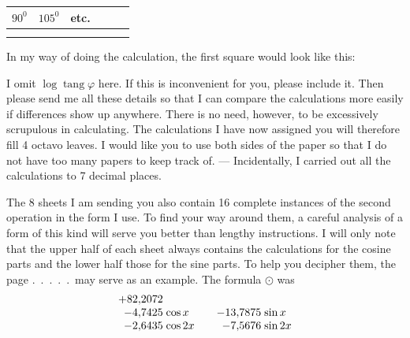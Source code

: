 \begin{landscape}
\begin{center}
\begin{tabular}{|c|c|c|c|c|c|}
\(90^0\)&\(105^0\)&etc.&&&\\\hline
\rule{0pt}{1.8em}&&&&&\\\hline
\rule{0pt}{1.8em}&&&&&\\\hline
\end{tabular}
\end{center}\endgroup
{}
\par\noindent In my way of doing the calculation, the first square would look like this:
\begin{center}
\end{center}
\par\noindent I omit \(\log\operatorname{tang}\varphi\) here. If this is inconvenient for you,
please include it.
Then please send me all these details so that
I can compare the calculations more easily if
differences show up anywhere. There is no need,
however, to be excessively scrupulous in calculating. The calculations I have now assigned you will therefore fill 4 octavo leaves. I would like you to use both sides of the paper so that I do not have too many
papers to keep track of. — Incidentally, I carried out all the calculations to 7 decimal places.
\par\noindent\hspace*{\parindent}The 8 sheets I am sending you also contain 16 complete instances of the second operation in the form I use. To find your
way around them, a careful analysis of a form of this kind will serve you
better than lengthy instructions. I will only note that the
upper half of each sheet always contains the calculations for the cosine parts and
the lower half those for the sine parts. To help you decipher them,
the page .\ .\ .\ .\ .\ may serve as an example. The formula \(\odot\) was
\[
\begin{array}{r@{\;}l@{\qquad}r@{\;}l}
+82{,}2072&&&\\
-4{,}7425&\cos x&-13{,}7875&\sin x\\
-2{,}6435&\cos2x&-7{,}5676&\sin2x\\

\end{array}\]
\end{landscape}
